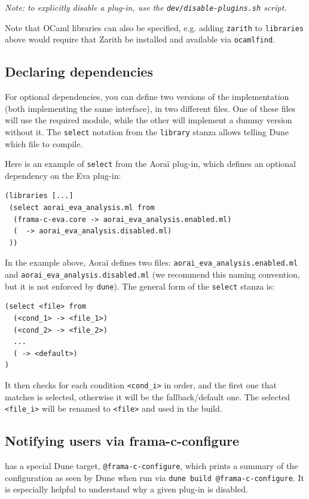 {\em Note: to explicitly disable a plug-in, use the
  \verb|dev/disable-plugins.sh| script.}

Note that OCaml libraries can also be specified, e.g. adding \verb|zarith|
to \verb|libraries| above would require that Zarith be installed and available
via \verb|ocamlfind|.

\subsection{Declaring dependencies}

For optional dependencies, you can define two versions of the implementation
(both implementing the same interface), in two different files. One of these
files will use the required module, while the other will implement a dummy
version without it. The \verb|select| notation from the \verb|library| stanza
allows telling Dune which file to compile.

Here is an example of \verb|select| from the \textsf{Aoraï} plug-in,
which defines an optional dependency on the \textsf{Eva} plug-in:

\begin{lstlisting}[language=Dune]
(libraries [...]
 (select aorai_eva_analysis.ml from
  (frama-c-eva.core -> aorai_eva_analysis.enabled.ml)
  (  -> aorai_eva_analysis.disabled.ml)
 ))
\end{lstlisting}

In the example above, \textsf{Aoraï} defines two files:
\verb|aorai_eva_analysis.enabled.ml| and \verb|aorai_eva_analysis.disabled.ml|
(we recommend this naming convention, but it is not enforced by \verb|dune|).
The general form of the \verb|select| stanza is:

\begin{lstlisting}
(select <file> from
  (<cond_1> -> <file_1>)
  (<cond_2> -> <file_2>)
  ...
  ( -> <default>)
)
\end{lstlisting}

It then checks for each condition \verb|<cond_i>| in order, and the first one
that matches is selected, otherwise it will be the fallback/default one. The
selected \verb|<file_i>| will be renamed to \verb|<file>| and used in the build.

\subsection{Notifying users via frama-c-configure}

\framac has a special Dune target, \verb|@frama-c-configure|, which prints a
summary of the configuration as seen by Dune when run via
\verb|dune build @frama-c-configure|. It is especially helpful to
understand why a given plug-in is disabled.

